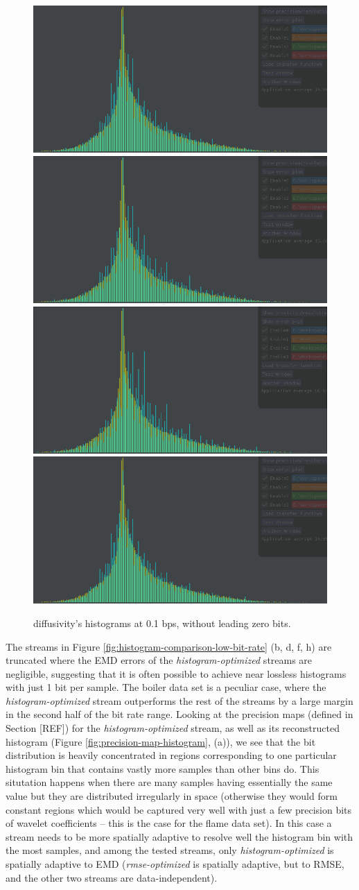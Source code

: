 \begin{figure}
	\centering
	{\includegraphics[width=0.24\linewidth]{img/histogram/diffusivity/histogram.png}}
	{\includegraphics[width=0.24\linewidth]{img/histogram/diffusivity/rmse.png}}
	{\includegraphics[width=0.24\linewidth]{img/histogram/diffusivity/wavenorm.png}}
	{\includegraphics[width=0.24\linewidth]{img/histogram/diffusivity/signature.png}}
	\caption{diffusivity's histograms at 0.1 bps, without leading zero bits. }
	\label{fig:histogram-comparison-low-bit-rate-slz}
\end{figure}

The streams in Figure \ref{fig:histogram-comparison-low-bit-rate} (b, d, f, h) are truncated where
the EMD errors of the \emph{histogram-optimized} streams are negligible, suggesting that it is often
possible to achieve near lossless histograms with just 1 bit per sample. The boiler data set is a
peculiar case, where the \emph{histogram-optimized} stream outperforms the rest of the streams by a
large margin in the second half of the bit rate range. Looking at the precision maps (defined in
Section [REF]) for the \emph{histogram-optimized} stream, as well as its reconstructed histogram
(Figure \ref{fig:precision-map-histogram}, (a)), we see that the bit distribution is heavily
concentrated in regions corresponding to one particular histogram bin that contains vastly more
samples than other bins do. This situtation happens when there are many samples having essentially
the same value but they are distributed irregularly in space (otherwise they would form constant
regions which would be captured very well with just a few precision bits of wavelet coefficients --
this is the case for the flame data set). In this case a stream needs to be more spatially adaptive
to resolve well the histogram bin with the most samples, and among the tested streams, only
\emph{histogram-optimized} is spatially adaptive to EMD (\emph{rmse-optimized} is spatially
adaptive, but to RMSE, and the other two streams are data-independent).

